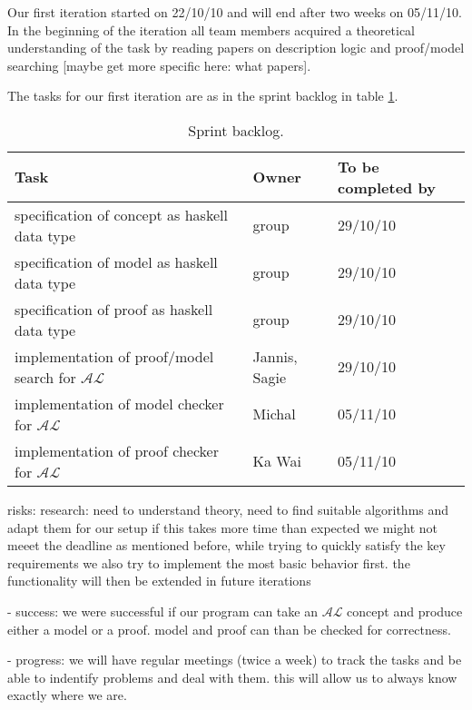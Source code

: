 
Our first iteration started on 22/10/10 and will end after two weeks on 05/11/10.
In the beginning of the iteration all team members acquired a theoretical understanding
of the task by reading papers on description logic and proof/model searching [maybe get
more specific here: what papers].


The tasks for our first iteration are as in the sprint backlog in table \ref{sprint}.

\begin{table} \label{sprint}
  \caption{Sprint backlog.}
  \begin{tabular}{l|l|l}
    \hline
    \textbf{Task} & \textbf{Owner} & \textbf{To be completed by} \\
    \hline
    specification of concept as haskell data type & group & 29/10/10 \\
    specification of model as haskell data type & group & 29/10/10 \\
    specification of proof as haskell data type & group & 29/10/10 \\
    implementation of proof/model search for $\mathcal{AL}$ & Jannis, Sagie & 29/10/10 \\
    implementation of model checker for $\mathcal{AL}$ & Michal & 05/11/10 \\
    implementation of proof checker for $\mathcal{AL}$ & Ka Wai & 05/11/10 \\    
  \end{tabular}
\end{table}


risks: research: need to understand theory, 
                 need to find suitable algorithms and adapt them for our setup
if this takes more time than expected we might not meeet the deadline
as mentioned before, while trying to quickly satisfy the key requirements we also
try to implement the most basic behavior first. the functionality will then be
extended in future iterations


- success: we were successful if our program can take an $\mathcal{AL}$ concept and produce
  either a model or a proof. model and proof can than be checked for correctness.

- progress: we will have regular meetings (twice a week) to track the tasks and be able
            to indentify problems and deal with them. this will allow us to always know
            exactly where we are.
